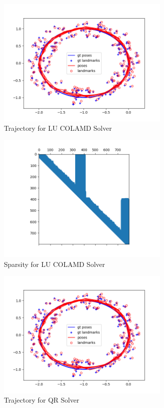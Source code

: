 \documentclass[12pt, a4paper]{article}
\begin{document}
\begin{figure}
    \center
    \includegraphics[width=0.75\textwidth]{linear_loop_results/lu_colamd.png}
    \caption{Trajectory for LU COLAMD Solver}
\end{figure}

\begin{figure}
    \center
    \includegraphics[width=0.75\textwidth]{linear_loop_results/lu_colamd_sparsity.png}
    \caption{Sparsity for LU COLAMD Solver}
\end{figure}

\begin{figure}
    \center
    \includegraphics[width=0.75\textwidth]{linear_loop_results/loop_qr.png}
    \caption{Trajectory for QR Solver}
\end{figure}
\end{document}
